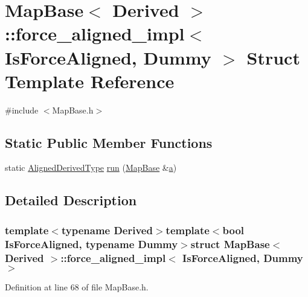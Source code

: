 \hypertarget{struct_map_base_1_1force__aligned__impl}{\section{Map\-Base$<$ Derived $>$\-:\-:force\-\_\-aligned\-\_\-impl$<$ Is\-Force\-Aligned, Dummy $>$ Struct Template Reference}
\label{struct_map_base_1_1force__aligned__impl}
}


{\ttfamily \#include $<$Map\-Base.\-h$>$}

\subsection*{Static Public Member Functions}
\begin{DoxyCompactItemize}
\item 
static \hyperlink{class_map_base_a57c5a3543f137919cfd9aba5aa05005a}{Aligned\-Derived\-Type} \hyperlink{struct_map_base_1_1force__aligned__impl_ab39b6a6007e9506cc0e2994ebd59ad1d}{run} (\hyperlink{class_map_base}{Map\-Base} \&\hyperlink{glext_8h_ac8729153468b5dcf13f971b21d84d4e5}{a})
\end{DoxyCompactItemize}


\subsection{Detailed Description}
\subsubsection*{template$<$typename Derived$>$template$<$bool Is\-Force\-Aligned, typename Dummy$>$struct Map\-Base$<$ Derived $>$\-::force\-\_\-aligned\-\_\-impl$<$ Is\-Force\-Aligned, Dummy $>$}



Definition at line 68 of file Map\-Base.\-h.



